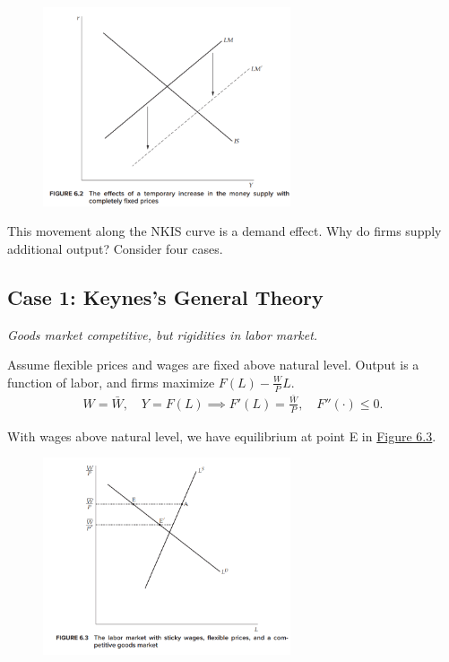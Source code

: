 \documentclass[../main.tex]{subfiles}
\begin{document}
        \begin{figure}[ht!]
            \centering \includegraphics[width=0.65\textwidth]{./attachments/6.1-ISLM.png}
            \label{fig:6.2}
        \end{figure}
        
        This movement along the NKIS curve is a demand effect. Why do firms supply additional output? Consider four cases.
        
    \subsection*{Case 1: Keynes's General Theory}
        \emph{Goods market competitive, but rigidities in labor market.}
        
        \vspace{0.25cm}
        
        Assume flexible prices and wages are fixed above natural level. Output is a function of labor, and firms maximize $F(L) - \frac{W}{P}L$.
        \begin{align}
            W = \bar W,
            \quad
            Y = F(L) \implies F'(L)
            = \frac{\bar W}{P},
            \quad
            F''(\cdot) \leq 0.
        \end{align}
        
        With wages above natural level, we have equilibrium at point E in \hyperref[fig:6.3]{Figure 6.3}.
        
        \begin{figure}[h!]
            \centering
            \includegraphics[width=0.65\textwidth]{./attachments/6.2-case1.png}
            \label{fig:6.3}
        \end{figure}
        
\end{document}
